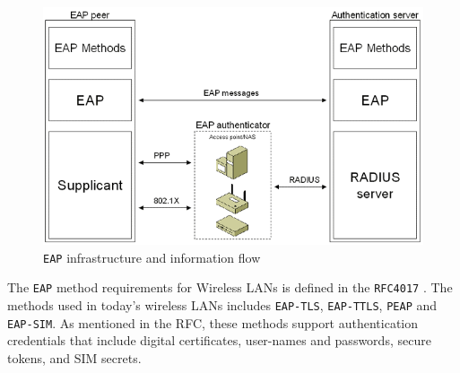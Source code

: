 \begin{figure}[H]
	\includegraphics[width=1\linewidth]{Pictures/chapter2/eap.png}
	\caption{\texttt{EAP} infrastructure and information flow}
\end{figure}

The \texttt{EAP} method requirements for Wireless LANs is defined in the \texttt{RFC4017} \cite{rfc4017}. The methods used in today's wireless LANs includes \texttt{EAP-TLS}, \texttt{EAP-TTLS}, \texttt{PEAP} and \texttt{EAP-SIM}. As mentioned in the RFC, these methods support authentication credentials that include digital certificates, user-names and passwords, secure tokens, and SIM secrets.

